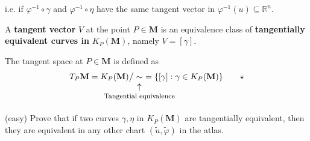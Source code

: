 \documentclass[../main.tex]{subfiles}
\begin{document}
i.e. if $\varphi^{-1} \circ \gamma$ and $\varphi^{-1} \circ \eta$ have the same tangent vector in $\varphi^{-1}(u)\subseteq\mathbb{R}^n$.
%	
\begin{definition}
A \textbf{tangent vector} $V$ at the point $P\in\mathbf{M}$ is an equivalence class of \textbf{tangentially equivalent curves in} $K_P(\mathbf{M})$, namely $V=[\gamma]$.
\end{definition}
\begin{definition}
The tangent space at $P\in\mathbf{M}$ is defined as
\[
T_P\mathbf{M}=K_P(\mathbf{M})\big/ \underset{\mathclap{\tikz \node {$\uparrow$} node [below=1ex] {\footnotesize Tangential equivalence};}}{\sim} \ =\{[\gamma]:\gamma\in K_P(\mathbf{M})\} \qquad \star
\]
\end{definition}
\begin{example}(easy)
Prove that if two curves $\gamma, \eta$ in $K_P(\mathbf{M})$ are tangentially equivalent, then they are equivalent in any other chart $(\tilde{u},\tilde{\varphi})$ in the atlas.
\end{example}
\end{document}
